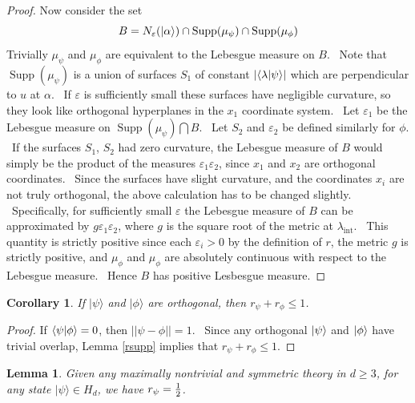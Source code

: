 \documentclass[letterpaper,12pt]{article}
\newtheorem{lem}{Lemma}
\newtheorem{cor}{Corollary}
\newcommand{\braket}[2]{\mbox{$ \langle #1 | #2 \rangle $}}
\newcommand{\ket}[1]{\mbox{$ | #1 \rangle $}}
\DeclareMathOperator{\supp}{Supp}
\begin{document}
\begin{proof}
Now consider the set
\[
B= N_{\varepsilon}(\ket{\alpha}) \cap  \supp(\mu_{\psi}) \cap \supp(\mu_{\phi})
\]
Trivially $\mu_{\psi}$ and $\mu_\phi$ are equivalent to the Lebesgue measure on $B$. \ Note that $\supp(\mu_{\psi})$ is a union of surfaces $S_1$ of constant $| \braket{\lambda }{\psi}|$ which are perpendicular to $u$ at $\alpha$. \ If $\varepsilon$ is sufficiently small these surfaces have negligible curvature, so they look like orthogonal hyperplanes in the $x_1$ coordinate system.  \ Let $\varepsilon_1$ be the Lebesgue measure on $\supp(\mu_{\psi}) \bigcap B$. \ Let $S_2$ and $\varepsilon_2$ be defined similarly for $\phi$. \ If the surfaces $S_1$, $S_2$ had zero curvature, the Lebesgue measure of $B$ would simply be the product of the measures $\varepsilon_1 \varepsilon_2$, since $x_1$ and $x_2$ are orthogonal coordinates. \ Since the surfaces have slight curvature, and the coordinates $x_i$ are not truly orthogonal, the above calculation has to be changed slightly. \ Specifically, for sufficiently small $\varepsilon$ the Lebesgue measure of $B$ can be approximated by $g\varepsilon_1 \varepsilon_2$, where $g$ is the square root of the metric at $\lambda_{\mathrm{int}}$. \ This quantity is strictly positive since each $\varepsilon_i>0$ by the definition of $r$, the metric $g$ is strictly positive, and $\mu_{\phi}$ and $\mu_\phi$ are absolutely continuous with respect to the Lebesgue measure. \ Hence $B$ has positive Lesbesgue measure.

\end{proof}

\begin{cor}
\label{rorth} If $ | \psi \rangle $ and $ | \phi \rangle $
are orthogonal, then $r_{\psi}+r_{\phi}\leq 1$.
\end{cor}

\begin{proof}
If $\braket{\psi}{\phi}=0$, then $||\psi-\phi||=1$. \ Since any orthogonal $\ket{\psi}$ and $\ket{\phi}$ have trivial overlap, Lemma \ref{rsupp} implies that $r_{\psi}+r_{\phi}\leq 1$.
\end{proof}

\begin{lem}
\label{rhalf} Given any maximally nontrivial and symmetric theory in $d\geq 3
$, for any state $ | \psi \rangle \in H_d$, we have $r_{\psi}=\frac{%
1}{2}$.
\end{lem}
\end{document}
